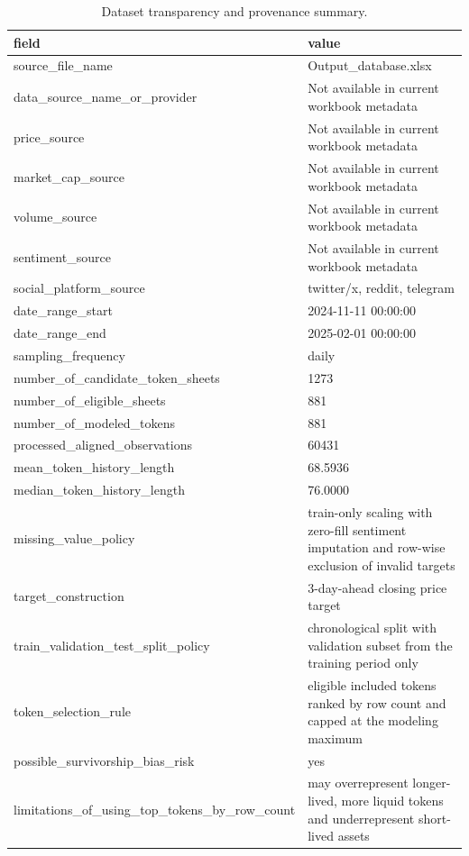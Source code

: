 \begin{table}[htbp]
\centering
\begin{tabular}{ll}
\hline
field & value \\
\hline
source_file_name & Output_database.xlsx \\
data_source_name_or_provider & Not available in current workbook metadata \\
price_source & Not available in current workbook metadata \\
market_cap_source & Not available in current workbook metadata \\
volume_source & Not available in current workbook metadata \\
sentiment_source & Not available in current workbook metadata \\
social_platform_source & twitter/x, reddit, telegram \\
date_range_start & 2024-11-11 00:00:00 \\
date_range_end & 2025-02-01 00:00:00 \\
sampling_frequency & daily \\
number_of_candidate_token_sheets & 1273 \\
number_of_eligible_sheets & 881 \\
number_of_modeled_tokens & 881 \\
processed_aligned_observations & 60431 \\
mean_token_history_length & 68.5936 \\
median_token_history_length & 76.0000 \\
missing_value_policy & train-only scaling with zero-fill sentiment imputation and row-wise exclusion of invalid targets \\
target_construction & 3-day-ahead closing price target \\
train_validation_test_split_policy & chronological split with validation subset from the training period only \\
token_selection_rule & eligible included tokens ranked by row count and capped at the modeling maximum \\
possible_survivorship_bias_risk & yes \\
limitations_of_using_top_tokens_by_row_count & may overrepresent longer-lived, more liquid tokens and underrepresent short-lived assets \\
\hline
\end{tabular}
\caption{Dataset transparency and provenance summary.}
\label{table_dataset_transparency}
\end{table}